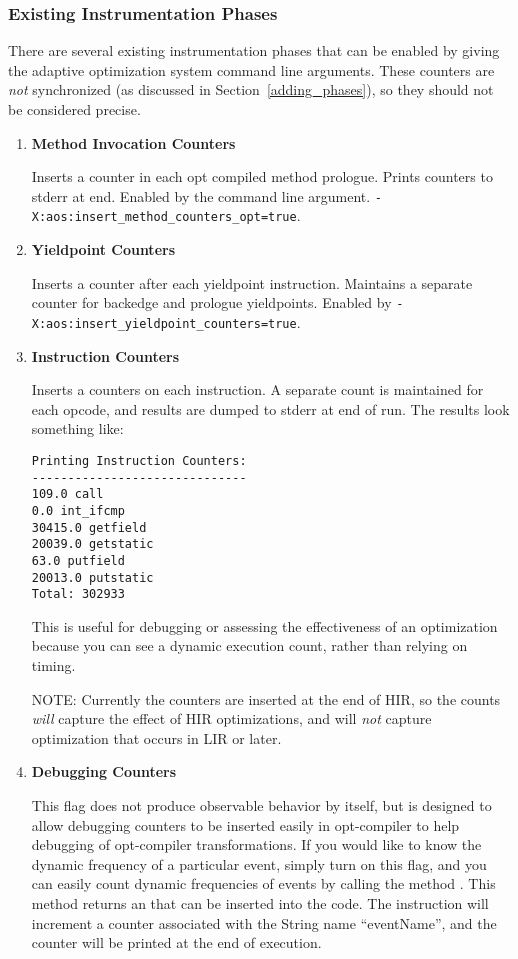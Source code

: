 \subsubsection{Existing Instrumentation Phases}
\label{existing_phases}
There are several existing instrumentation phases that can be enabled
by giving the adaptive optimization system command line
arguments. These counters are {\em not} synchronized (as discussed in
Section~\ref{adding_phases}), so they should not be considered
precise. 
\begin{enumerate}
\item {\bf Method Invocation Counters} 

Inserts a counter in each opt compiled method prologue.  Prints
counters to stderr at end. Enabled by the command line argument.
{\tt -X:aos:insert\_method\_counters\_opt=true}.

\item {\bf Yieldpoint Counters}  

Inserts a counter after each yieldpoint instruction.  Maintains a
separate counter for backedge and prologue yieldpoints. Enabled by 
{\tt -X:aos:insert\_yieldpoint\_counters=true}.

\item {\bf Instruction Counters}  

Inserts a counters on each instruction.  A separate count is
maintained for each opcode, and results are dumped to stderr at end of
run. The results look something like:

\begin{verbatim}
Printing Instruction Counters:
------------------------------
109.0 call
0.0 int_ifcmp
30415.0 getfield
20039.0 getstatic
63.0 putfield
20013.0 putstatic
Total: 302933
\end{verbatim}

This is useful for debugging or assessing the effectiveness
of an optimization because you can see a dynamic execution count, rather
than relying on timing.  

NOTE: Currently the counters are inserted at the end of HIR, so the
counts {\em will} capture the effect of HIR optimizations, and will
{\em not} capture optimization that occurs in LIR or later.  

\item {\bf Debugging Counters}  

This flag does not produce observable behavior by itself, but is
designed to allow debugging counters to be inserted easily in
opt-compiler to help debugging of opt-compiler transformations.
If you would like to know the dynamic frequency of a particular
event, simply turn on this flag, and you can easily count dynamic
frequencies of events by calling the method
.  This method
returns an 
that can be inserted into the
code.  The instruction will increment a counter associated with
the String name ``eventName'', and the counter will be printed at the
end of execution.


\end{enumerate}
